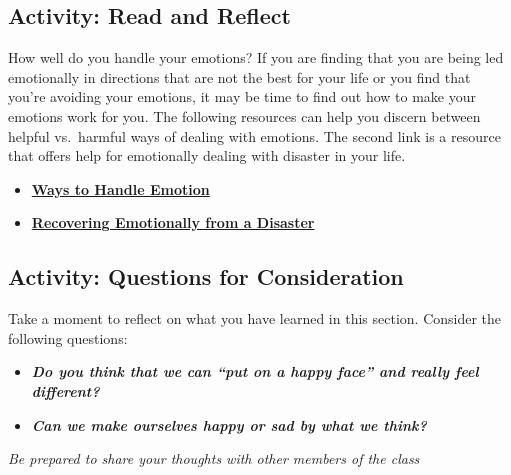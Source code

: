 \documentclass[
]{book}
\providecommand{\tightlist}{%
  \setlength{\itemsep}{0pt}\setlength{\parskip}{0pt}}
\begin{document}
\hypertarget{activity-read-and-reflect-14}{%
\subsection*{Activity: Read and Reflect}\label{activity-read-and-reflect-14}}

\begin{reflect}
How well do you handle your emotions? If you are finding that you are being led emotionally in directions that are not the best for your life or you find that you're avoiding your emotions, it may be time to find out how to make your emotions work for you. The following resources can help you discern between helpful vs.~harmful ways of dealing with emotions. The second link is a resource that offers help for emotionally dealing with disaster in your life.

\begin{itemize}
\tightlist
\item
  \href{https://www.mhanational.org/helpful-vs-harmful-ways-manage-emotions}{\textbf{Ways to Handle Emotion}}\\
\item
  \href{https://www.apa.org/helpcenter/recovering-disasters}{\textbf{Recovering Emotionally from a Disaster}}
\end{itemize}
\end{reflect}

\hypertarget{activity-questions-for-consideration-12}{%
\subsection*{Activity: Questions for Consideration}\label{activity-questions-for-consideration-12}}

\begin{reflect}
Take a moment to reflect on what you have learned in this section. Consider the following questions:

\begin{itemize}
\item
  \textbf{\emph{Do you think that we can ``put on a happy face'' and really feel different?}}
\item
  \textbf{\emph{Can we make ourselves happy or sad by what we think?}}
\end{itemize}

\emph{Be prepared to share your thoughts with other members of the class}
\end{reflect}
\end{document}
